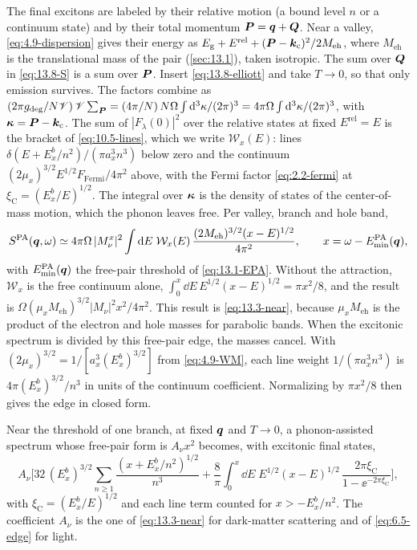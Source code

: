 The final excitons are labeled by their relative motion (a bound level $n$ or a continuum state) and by their total momentum $\bm{P} = \bm{q}+\bm{Q}$. Near a valley, \cref{eq:4.9-dispersion} gives their energy as $E_{\mathrm{g}} + E^{\mathrm{rel}} + (\bm{P} - \bm{k}_{\mathrm{c}})^2/2M_{\mathrm{eh}}$, where $M_{\mathrm{eh}}$ is the translational mass of the pair (\cref{sec:13.1}), taken isotropic. The sum over $\bm{Q}$ in \cref{eq:13.8-S} is a sum over $\bm{P}$. Insert \cref{eq:13.8-elliott} and take $T \to 0$, so that only emission survives. The factors combine as $(2\pi g_{\mathrm{deg}}/N\mathscr{V})\,\mathscr{V}\sum_{\bm{P}} = (4\pi/N)\,N\Omega\int\mathrm{d}^3\kappa/(2\pi)^3 = 4\pi\Omega\int\mathrm{d}^3\kappa/(2\pi)^3$, with $\bm{\kappa} = \bm{P} - \bm{k}_{\mathrm{c}}$. The sum of $|F_\lambda(0)|^2$ over the relative states at fixed $E^{\mathrm{rel}} = E$ is the bracket of \cref{eq:10.5-lines}, which we write $\mathcal{W}_x(E)$: lines $\delta(E + E_x^b/n^2)/(\pi a_x^3n^3)$ below zero and the continuum $(2\mu_x)^{3/2}E^{1/2}F_{\mathrm{Fermi}}/4\pi^2$ above, with the Fermi factor \cref{eq:2.2-fermi} at $\xi_{\mathrm{C}} = (E_x^b/E)^{1/2}$. The integral over $\bm{\kappa}$ is the density of states of the center-of-mass motion, which the phonon leaves free. Per valley, branch and hole band,
\begin{equation*}
  S^{\mathrm{PA}}(\bm{q},\omega) \simeq 4\pi\Omega\,|M^x_\nu|^2\int\mathrm{d} E\;\mathcal{W}_x(E)\,\frac{(2M_{\mathrm{eh}})^{3/2}(x - E)^{1/2}}{4\pi^2} , \qquad x = \omega - E_{\mathrm{min}}^{\mathrm{PA}}(\bm{q}) ,
\end{equation*}
with $E_{\mathrm{min}}^{\mathrm{PA}}(\bm{q})$ the free-pair threshold of \cref{eq:13.1-EPA}. Without the attraction, $\mathcal{W}_x$ is the free continuum alone, $\int_0^x\dd E\,E^{1/2}(x - E)^{1/2} = \pi x^2/8$, and the result is $\Omega(\mu_xM_{\mathrm{eh}})^{3/2}|M_\nu|^2x^2/4\pi^2$. This result is \cref{eq:13.3-near}, because $\mu_xM_{\mathrm{eh}}$ is the product of the electron and hole masses for parabolic bands. When the excitonic spectrum is divided by this free-pair edge, the masses cancel. With $(2\mu_x)^{3/2} = 1/[a_x^3(E_x^b)^{3/2}]$ from \cref{eq:4.9-WM}, each line weight $1/(\pi a_x^3n^3)$ is $4\pi(E_x^b)^{3/2}/n^3$ in units of the continuum coefficient. Normalizing by $\pi x^2/8$ then gives the edge in closed form.
\begin{keyresult}
Near the threshold of one branch, at fixed $\bm{q}$ and $T \to 0$, a phonon-assisted spectrum whose free-pair form is $A_\nu x^2$ becomes, with excitonic final states,
\begin{equation}
  A_\nu\biggl[32\,(E_x^b)^{3/2}\sum_{n\ge1}\frac{(x + E_x^b/n^2)^{1/2}}{n^3} + \frac{8}{\pi}\int_0^x\dd E\;E^{1/2}(x - E)^{1/2}\,\frac{2\pi\xi_{\mathrm{C}}}{1 - \ee^{-2\pi\xi_{\mathrm{C}}}}\biggr] ,
  \label{eq:13.8-edge}
\end{equation}
with $\xi_{\mathrm{C}} = (E_x^b/E)^{1/2}$ and each line term counted for $x > -E_x^b/n^2$. The coefficient $A_\nu$ is the one of \cref{eq:13.3-near} for dark-matter scattering and of \cref{eq:6.5-edge} for light.
\end{keyresult}

